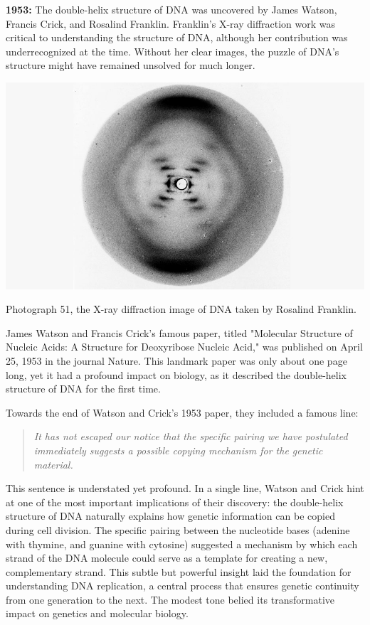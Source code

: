 \medskip\noindent\textbf{1953:} The double-helix structure of DNA was uncovered by James Watson, Francis Crick, and Rosalind Franklin. Franklin’s X-ray diffraction work was critical to understanding the structure of DNA, although her contribution was underrecognized at the time. Without her clear images, the puzzle of DNA’s structure might have remained unsolved for much longer.

\begin{marginfigure}
    \includegraphics{figs/history/photograph-51.jpeg}
    \caption[6pt]{Photograph 51, the X-ray diffraction image of DNA taken by Rosalind Franklin.}
    \label{fig:photograph-51}
\end{marginfigure}

James Watson and Francis Crick's famous paper, titled "Molecular Structure of Nucleic Acids: A Structure for Deoxyribose Nucleic Acid," was published on April 25, 1953 in the journal Nature. This landmark paper was only about one page long, yet it had a profound impact on biology, as it described the double-helix structure of DNA for the first time.

Towards the end of Watson and Crick’s 1953 paper, they included a famous line:
\begin{quote}
    \textit{It has not escaped our notice that the specific pairing we have postulated immediately suggests a possible copying mechanism for the genetic material.}
\end{quote}
This sentence is understated yet profound. In a single line, Watson and Crick hint at one of the most important implications of their discovery: the double-helix structure of DNA naturally explains how genetic information can be copied during cell division. The specific pairing between the nucleotide bases (adenine with thymine, and guanine with cytosine) suggested a mechanism by which each strand of the DNA molecule could serve as a template for creating a new, complementary strand. This subtle but powerful insight laid the foundation for understanding DNA replication, a central process that ensures genetic continuity from one generation to the next. The modest tone belied its transformative impact on genetics and molecular biology.

